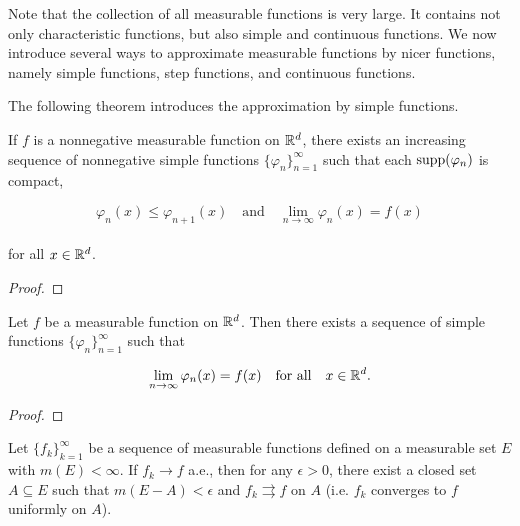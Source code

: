 \documentclass[12pt, a4paper, openany, twoside]{book}
\theoremstyle{definition}
\theoremstyle{remark}
\theoremstyle{plain}
\numberwithin{equation}{section}
\begin{document}
Note that the collection of all measurable functions is very large. It contains not only characteristic functions, but also simple and continuous functions. We now introduce several ways to approximate measurable functions by nicer functions, namely simple functions, step functions, and continuous functions.

\vspace{5mm}
The following theorem introduces the approximation by simple functions.

\vspace{5mm}
\begin{tcolorbox}[colback=yellow!10!white,colframe=red!75!black,title=Theorem 1.4.7]\label{Theorem 1.4.7}
    If $f$ is a nonnegative measurable function on ${\mathbb {R}}^d$, there exists an increasing sequence of nonnegative simple functions $\{\varphi_n\}_{n=1}^{\infty}$ such that each $\mathrm{supp}(\varphi_n)$ is compact,

    \[\varphi_{n}(x)\leq \varphi_{n+1}(x)\quad\text{and}\quad \lim_{n\rightarrow\infty}{\varphi_n(x)}=f(x)\]
    \\
    for all $x\in{\mathbb {R}}^d$.
\end{tcolorbox}
\begin{proof}
    
\end{proof}
\vspace{5mm}
\begin{tcolorbox}[colback=yellow!10!white,colframe=red!75!black,title=Theorem 1.4.8]\label{Theorem 1.4.8}
    Let $f$ be a measurable function on ${\mathbb {R}}^d$. Then there exists a sequence of simple functions $\{\varphi_n\}_{n=1}^{\infty}$ such that 

    \[\lim_{n\rightarrow\infty}{\varphi_n(x)}=f(x)\quad\text{for all}\quad x\in{\mathbb {R}}^d.\]
\end{tcolorbox}
\begin{proof}
    
\end{proof}
\vspace{5mm}
\begin{tcolorbox}[colback=yellow!10!white,colframe=red!75!black,title=Theorem 1.4.9 (Egorov's Theorem)]\label{Theorem 1.4.9}
    Let $\{f_k\}_{k=1}^{\infty}$ be a sequence of measurable functions defined on a measurable set $E$ with $m(E)<\infty$. If $f_k\rightarrow f$ a.e., then for any $\epsilon>0$, there exist a closed set $A\subseteq E$ such that $m(E-A)<\epsilon$ and $f_k\rightrightarrows f$ on $A$ (i.e. $f_k$ converges to $f$ uniformly on $A$).
\end{tcolorbox}
\end{document}
